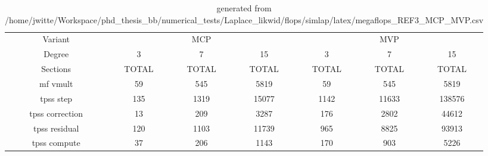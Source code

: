 \documentclass[oneside,a4paper]{article}
\newcommand{\myrowcolor}{\rowcolor[gray]{0.925}}
\begin{document}
\begin{table}[htbp]
\centering

\caption{generated from /home/jwitte/Workspace/phd\_thesis\_bb/numerical\_tests/Laplace\_likwid/flops/simlap/latex/megaflops\_REF3\_MCP\_MVP.csv}
\begin{tabular}{ccccccc}
\toprule %
Variant & \multicolumn{3}{c}{MCP} & \multicolumn{3}{c}{MVP} \\
\cmidrule(lr){1-1} \cmidrule(lr){2-4} \cmidrule(lr){5-7}
Degree & 3 & 7 & 15 & 3 & 7 & 15 \\
\cmidrule(lr){1-7}
Sections & TOTAL & TOTAL & TOTAL & TOTAL & TOTAL & TOTAL \\
\midrule %
\myrowcolor
mf vmult & 59 & 545 & 5819 & 59 & 545 & 5819 \\
tpss step & 135 & 1319 & 15077 & 1142 & 11633 & 138576 \\
\myrowcolor
tpss correction & 13 & 209 & 3287 & 176 & 2802 & 44612 \\
tpss residual & 120 & 1103 & 11739 & 965 & 8825 & 93913 \\
\myrowcolor
tpss compute & 37 & 206 & 1143 & 170 & 903 & 5226 \\
\bottomrule
\end{tabular}

\end{table}
\end{document}
